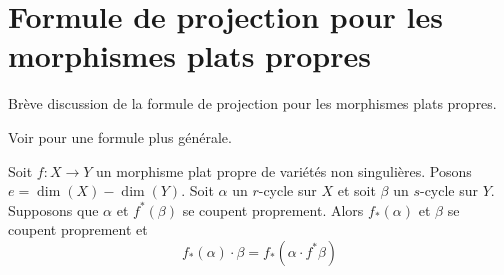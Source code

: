 \section{Formule de projection pour les morphismes plats propres}
\label{section-projection-formula-flat}

\noindent
Brève discussion de la formule de projection pour les morphismes plats propres.

\begin{lemma}
\label{lemma-projection-formula-flat}
\begin{reference}
Voir \cite[Chapter V, C), Section 7, formula (10)]{Serre_algebre_locale}
pour une formule plus générale.
\end{reference}
Soit $f : X \to Y$ un morphisme plat propre de variétés non singulières.
Posons $e = \dim(X) - \dim(Y)$. Soit $\alpha$ un $r$-cycle sur $X$ et soit
$\beta$ un $s$-cycle sur $Y$. Supposons que $\alpha$ et $f^*(\beta)$ se coupent
proprement. Alors $f_*(\alpha)$ et $\beta$ se coupent proprement et
$$
f_*(\alpha) \cdot \beta = f_*( \alpha \cdot f^*\beta)
$$
\end{lemma}

